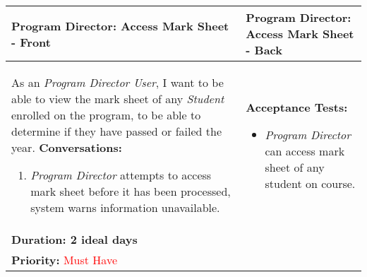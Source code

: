 \documentclass[11pt]{article}
\begin{document}
\begin{center}
\begin{tabular}{ | m{8cm}  |  m{8cm}  | } 
 \hline
 \textbf{Program Director: Access Mark Sheet - Front} &  \textbf{Program Director: Access Mark Sheet - Back}  \\ 
  \hline
As an \emph{Program Director User}, I want to be able to view the mark sheet of any \emph{Student} enrolled on the program, to be able to determine if they have passed or failed the year. \newline
\textbf{Conversations:}
\begin{enumerate}
\item{\emph{Program Director} attempts to access mark sheet before it has been processed, system warns information unavailable.}
\end{enumerate}
& \textbf{Acceptance Tests:} 
\begin{itemize}
\item{\emph{Program Director} can access mark sheet of any student on course.}
\end{itemize} \\
\textbf{Duration: 2 ideal days} &\\
\textbf{Priority:}  \textcolor{red}{Must Have} & \\
 \hline
\end{tabular}
\end{center}
\end{document}
